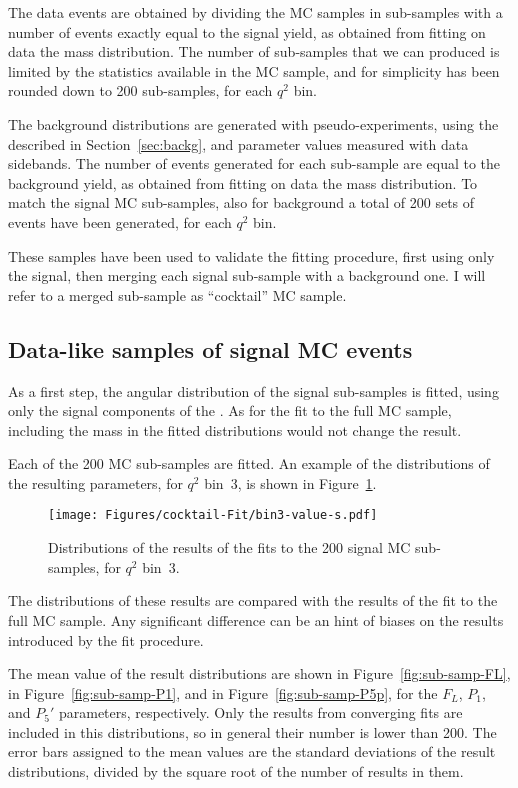 The data events are obtained by dividing the MC samples in sub-samples with a number of events exactly equal to the signal yield, as obtained from fitting on data the \PBz mass distribution.
The number of sub-samples that we can produced is limited by the statistics available in the MC sample, and for simplicity has been rounded down to 200 sub-samples, for each $q^2$ bin.

The background distributions are generated with pseudo-experiments, using the \pdf described in Section~\ref{sec:backg}, and parameter values measured with data sidebands.
The number of events generated for each sub-sample are equal to the background yield, as obtained from fitting on data the \PBz mass distribution.
To match the signal MC sub-samples, also for background a total of 200 sets of events have been generated, for each $q^2$ bin.

These samples have been used to validate the fitting procedure, first using only the signal, then merging each signal sub-sample with a background one.
I will refer to a merged sub-sample as ``cocktail'' MC sample.

\subsection{Data-like samples of signal MC events}
\label{sec:Cocktail-MC-pure}

As a first step, the angular distribution of the signal sub-samples is fitted, using only the signal components of the \pdf.
As for the fit to the full MC sample, including the mass in the fitted distributions would not change the result.

Each of the 200 MC sub-samples are fitted.
An example of the distributions of the resulting parameters, for $q^2$ bin~3, is shown in Figure~\ref{fig:closure-signal-cocktail-bin3}.

\begin{figure}[!hbt]
  \centering
  \texttt{[image: Figures/cocktail-Fit/bin3-value-s.pdf]}
  \caption{Distributions of the results of the fits to the 200 signal MC sub-samples, for $q^2$ bin~3.}
  \label{fig:closure-signal-cocktail-bin3}
\end{figure}

The distributions of these results are compared with the results of the fit to the full MC sample.
Any significant difference can be an hint of biases on the results introduced by the fit procedure.

The mean value of the result distributions are shown in Figure~\ref{fig:sub-samp-FL}, in Figure~\ref{fig:sub-samp-P1}, and in Figure~\ref{fig:sub-samp-P5p}, for the $F_L$, $P_1$, and $P_5'$ parameters, respectively.
Only the results from converging fits are included in this distributions, so in general their number is lower than 200.
The error bars assigned to the mean values are the standard deviations of the result distributions, divided by the square root of the number of results in them. 


